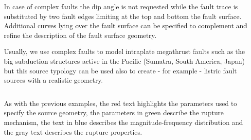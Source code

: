 In case of complex faults the dip angle is not requested while the fault trace
is substituted by two fault edges limiting at the top and bottom the fault
surface. Additional curves lying over the fault surface can be specified to
complement and refine the description of the fault surface geometry.

Usually, we use complex faults to model intraplate megathrust faults such as
the big subduction structures active in the Pacific (Sumatra, South America,
Japan) but this source typology can be used also to create - for example -
listric fault sources with a realistic geometry.

\inputminted[firstline=1,firstnumber=1,fontsize=\footnotesize,frame=single,linenos,bgcolor=lightgray]{xml}{oqum/hazard/verbatim/input_complex_fault.xml}

%

As with the previous examples, the red text highlights the parameters used to
specify the source geometry, the parameters in green describe the rupture
mechanism, the text in blue describes the magnitude-frequency distribution and
the gray text describes the rupture properties.
